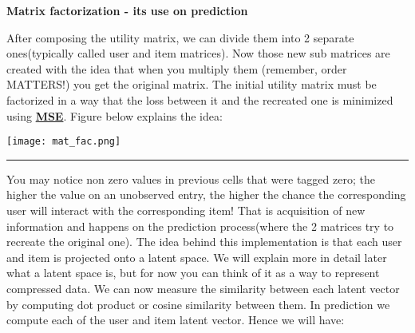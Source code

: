 \documentclass[]{article}
\begin{document}
\begin{center}
	\Large\textbf{Matrix factorization - its use on prediction}
	
	After composing the utility matrix, we can divide them into 2 separate ones(typically called user and item matrices). Now those new sub matrices are created with the idea that when you multiply them (remember, order MATTERS!) you get the original matrix. The initial utility matrix must be factorized in a way that the loss between it and the recreated one is minimized using \href{https://www.statisticshowto.com/probability-and-statistics/statistics-definitions/mean-squared-error/#:~:text=mean%20squared%20error%20(MSE)}{\textbf{MSE}}.
	Figure below explains the idea:
	
	\texttt{[image: mat\_fac.png]}
	\\
	\noindent
	{\color{Blue} \rule{\linewidth}{0.5mm}}
	
	You may notice non zero values in previous cells that were tagged zero; the higher the value on an unobserved entry, the higher the chance the corresponding user will interact with the corresponding item! That is acquisition of new information and happens on the prediction process(where the 2 matrices try to recreate the original one). The idea behind this implementation is that each user and item is projected onto a latent space. We will explain more in detail later what a latent space is, but for now you can think of it as a way to represent compressed data. We can now measure the similarity between each latent vector by computing dot product or cosine similarity between them. In prediction we compute each of the user and item latent vector. Hence we will have: 


\end{center}
\end{document}
